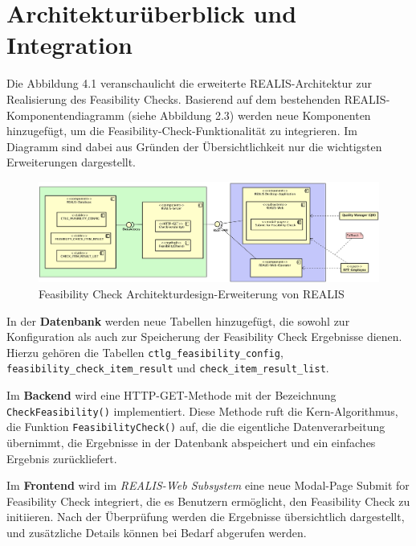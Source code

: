 \section{Architekturüberblick und Integration}

Die Abbildung 4.1 veranschaulicht die erweiterte REALIS-Architektur zur Realisierung des Feasibility Checks. Basierend auf dem bestehenden REALIS-Komponentendiagramm (siehe Abbildung 2.3) werden neue Komponenten hinzugefügt, um die Feasibility-Check-Funktionalität zu integrieren. Im Diagramm sind dabei aus Gründen der Übersichtlichkeit nur die wichtigsten Erweiterungen dargestellt.

\begin{figure}[!htbp]
    \centering
    \includegraphics[width=1\textwidth]{bilder/KomponentenDiagramm-REALIS-mitErweiterungen.png}
    \caption{Feasibility Check Architekturdesign-Erweiterung von \gls{REALIS}}
    \label{fig:feasibility-check-komponentendiagramm}
\end{figure}


In der \textbf{Datenbank} werden neue Tabellen hinzugefügt, die sowohl zur Konfiguration als auch zur Speicherung der Feasibility Check Ergebnisse dienen. Hierzu gehören die Tabellen \texttt{ctlg\_feasibility\_config}, \texttt{feasibility\_check\_item\_result} und \texttt{check\_item\_\-result\_\-list}.

Im \textbf{Backend} wird eine HTTP-GET-Methode mit der Bezeichnung \texttt{CheckFeasibility()} implementiert. Diese Methode ruft die Kern-Algorithmus, die Funktion \texttt{FeasibilityCheck()} auf, die die eigentliche Datenverarbeitung übernimmt, die Ergebnisse in der Datenbank abspeichert und ein einfaches Ergebnis zurückliefert.

Im \textbf{Frontend} wird im \textit{REALIS-Web Subsystem} eine neue Modal-Page \glqq Submit for Feasibility Check\grqq{} integriert, die es Benutzern ermöglicht, den Feasibility Check zu initiieren. Nach der Überprüfung werden die Ergebnisse übersichtlich dargestellt, und zusätzliche Details können bei Bedarf abgerufen werden. 

